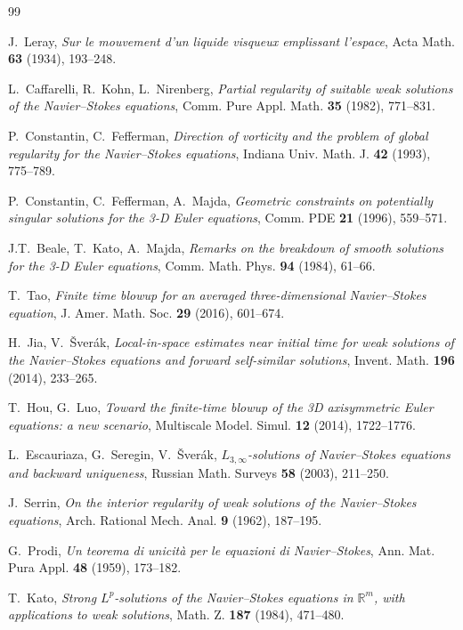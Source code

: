 \documentclass[11pt]{article}
\theoremstyle{definition}
\theoremstyle{remark}
\begin{document}
\begin{thebibliography}{99}

J.~Leray,
\textit{Sur le mouvement d'un liquide visqueux emplissant l'espace},
Acta Math. \textbf{63} (1934), 193--248.

L.~Caffarelli, R.~Kohn, L.~Nirenberg,
\textit{Partial regularity of suitable weak solutions of the Navier--Stokes equations},
Comm. Pure Appl. Math. \textbf{35} (1982), 771--831.

P.~Constantin, C.~Fefferman,
\textit{Direction of vorticity and the problem of global regularity for the
Navier--Stokes equations},
Indiana Univ. Math. J. \textbf{42} (1993), 775--789.

P.~Constantin, C.~Fefferman, A.~Majda,
\textit{Geometric constraints on potentially singular solutions for the 3-D Euler
equations},
Comm. PDE \textbf{21} (1996), 559--571.

J.T.~Beale, T.~Kato, A.~Majda,
\textit{Remarks on the breakdown of smooth solutions for the 3-D Euler equations},
Comm. Math. Phys. \textbf{94} (1984), 61--66.

T.~Tao,
\textit{Finite time blowup for an averaged three-dimensional Navier--Stokes equation},
J. Amer. Math. Soc. \textbf{29} (2016), 601--674.

H.~Jia, V.~\v{S}ver\'ak,
\textit{Local-in-space estimates near initial time for weak solutions of the
Navier--Stokes equations and forward self-similar solutions},
Invent. Math. \textbf{196} (2014), 233--265.

T.~Hou, G.~Luo,
\textit{Toward the finite-time blowup of the 3D axisymmetric Euler equations: a new
scenario},
Multiscale Model. Simul. \textbf{12} (2014), 1722--1776.

L.~Escauriaza, G.~Seregin, V.~\v{S}ver\'ak,
\textit{$L_{3,\infty}$-solutions of Navier--Stokes equations and backward uniqueness},
Russian Math. Surveys \textbf{58} (2003), 211--250.

J.~Serrin,
\textit{On the interior regularity of weak solutions of the Navier--Stokes equations},
Arch. Rational Mech. Anal. \textbf{9} (1962), 187--195.

G.~Prodi,
\textit{Un teorema di unicit\`a per le equazioni di Navier--Stokes},
Ann. Mat. Pura Appl. \textbf{48} (1959), 173--182.

T.~Kato,
\textit{Strong $L^p$-solutions of the Navier--Stokes equations in $\mathbb{R}^m$,
with applications to weak solutions},
Math. Z. \textbf{187} (1984), 471--480.


\end{thebibliography}
\end{document}
